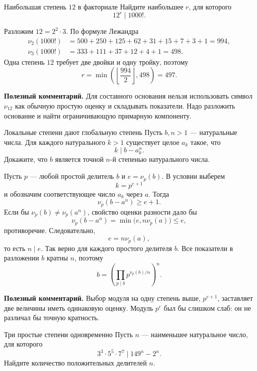 \begin{problembox}{Наибольшая степень $12$ в факториале}
Найдите наибольшее $r$, для которого
\[
  12^r\mid1000!.
\]
\end{problembox}

\begin{solutionbox}
Разложим $12=2^2\cdot3$. По формуле Лежандра
\begin{align*}
  \nu_2(1000!)
  &=500+250+125+62+31+15+7+3+1=994,\\
  \nu_3(1000!)
  &=333+111+37+12+4+1=498.
\end{align*}
Одна степень $12$ требует две двойки и одну тройку, поэтому
\[
  r=\min\left(
  \left\lfloor\frac{994}{2}\right\rfloor,
  498\right)=\boxed{497}.
\]

\textbf{Полезный комментарий.}
Для составного основания нельзя использовать символ $\nu_{12}$ как
обычную простую оценку и складывать показатели. Надо разложить основание
и найти ограничивающую примарную компоненту.
\end{solutionbox}

\begin{problembox}{Локальные степени дают глобальную степень}
Пусть $b,n>1$ --- натуральные числа. Для каждого натурального $k>1$
существует целое $a_k$ такое, что
\[
  k\mid b-a_k^n.
\]
Докажите, что $b$ является точной $n$-й степенью натурального числа.
\end{problembox}

\begin{solutionbox}
Пусть $p$ --- любой простой делитель $b$ и $e=\nu_p(b)$. В условии
выберем
\[
  k=p^{e+1}
\]
и обозначим соответствующее число $a_k$ через $a$. Тогда
\[
  \nu_p(b-a^n)\ge e+1.
\]
Если бы $\nu_p(b)\ne\nu_p(a^n)$, свойство оценки разности дало бы
\[
  \nu_p(b-a^n)
  =\min\bigl(e,n\nu_p(a)\bigr)\le e,
\]
противоречие. Следовательно,
\[
  e=n\nu_p(a),
\]
то есть $n\mid e$. Так верно для каждого простого делителя $b$.
Все показатели в разложении $b$ кратны $n$, поэтому
\[
  b=\left(\prod_{p\mid b}p^{\nu_p(b)/n}\right)^n.
\]

\textbf{Полезный комментарий.}
Выбор модуля на одну степень выше, $p^{e+1}$, заставляет две величины
иметь одинаковую оценку. Модуль $p^e$ был бы слишком слаб: он не
различал бы точную кратность.
\end{solutionbox}

\begin{problembox}{Три простые степени одновременно}
Пусть $n$ --- наименьшее натуральное число, для которого
\[
  3^3\cdot5^5\cdot7^7\mid149^n-2^n.
\]
Найдите количество положительных делителей $n$.
\end{problembox}

